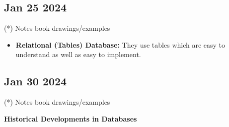 \documentclass[12pt]{article}
\begin{document}
\subsection{Jan 25 2024}

(*) Notes book drawings/examples

\begin{itemize}
		  \item \textbf{Relational (Tables)  Database:} They use tables which are easy to understand as well as
					 easy to implement. 
\end{itemize}

\subsection{Jan 30 2024}

(*) Notes book drawings/examples

\textbf{Historical Developments in Databases}
\end{document}
